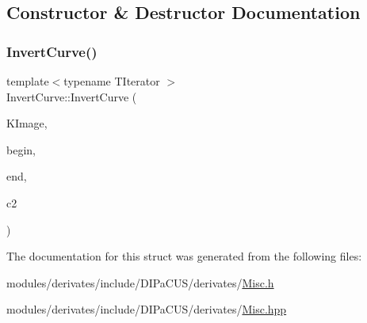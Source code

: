 \subsection{Constructor \& Destructor Documentation}
\mbox{\label{structDIPaCUS_1_1Misc_1_1InvertCurve_a551b582c8c9abf2f86937a7c7468491e}} 
\subsubsection{\texorpdfstring{Invert\+Curve()}{InvertCurve()}}
{\footnotesize\ttfamily template$<$typename T\+Iterator $>$ \\
Invert\+Curve\+::\+Invert\+Curve (\begin{DoxyParamCaption}\item[{const \mbox{\hyperlink{structDIPaCUS_1_1Misc_1_1InvertCurve_a64773d7b4da91e66b4cc83112d4aa1d1}{K\+Space}} \&}]{K\+Image,  }\item[{T\+Iterator}]{begin,  }\item[{T\+Iterator}]{end,  }\item[{\mbox{\hyperlink{structDIPaCUS_1_1Misc_1_1InvertCurve_a4a338524a4f9be41169d6eeb519c6a20}{Curve}} \&}]{c2 }\end{DoxyParamCaption})}



The documentation for this struct was generated from the following files\+:\begin{DoxyCompactItemize}
\item 
modules/derivates/include/\+D\+I\+Pa\+C\+U\+S/derivates/\mbox{\hyperlink{Misc_8h}{Misc.\+h}}\item 
modules/derivates/include/\+D\+I\+Pa\+C\+U\+S/derivates/\mbox{\hyperlink{Misc_8hpp}{Misc.\+hpp}}\end{DoxyCompactItemize}
